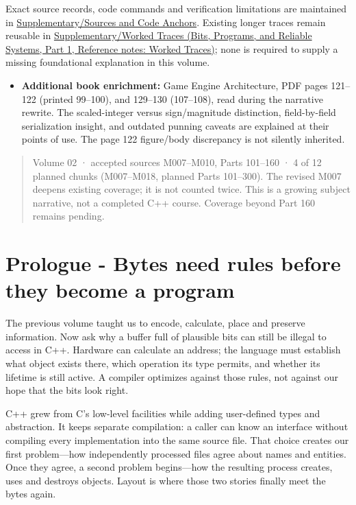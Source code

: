 Exact source records, code commands and verification limitations are maintained in \hyperref[appendix-a103e7846d21]{Supplementary/Sources and Code Anchors}. Existing longer traces remain reusable in \href{../01-Bits-Programs-and-Reliable-Systems-P01/main.pdf\#nameddest=appendix-92ff77d4dfdc}{Supplementary/Worked Traces (Bits, Programs, and Reliable Systems, Part 1, Reference notes: Worked Traces)}; none is required to supply a missing foundational explanation in this volume.

\begin{itemize}
\tightlist
\item
  \textbf{Additional book enrichment:} Game Engine Architecture, PDF pages 121--122 (printed 99--100), and 129--130 (107--108), read during the narrative rewrite. The scaled-integer versus sign/magnitude distinction, field-by-field serialization insight, and outdated punning caveats are explained at their points of use. The page 122 figure/body discrepancy is not silently inherited.
\end{itemize}

\begin{quote}
Volume 02 · accepted sources M007--M010, Parts 101--160 · 4 of 12 planned chunks (M007--M018, planned Parts 101--300). The revised M007 deepens existing coverage; it is not counted twice. This is a growing subject narrative, not a completed C++ course. Coverage beyond Part 160 remains pending.
\end{quote}

\section{Prologue - Bytes need rules before they become a program}\label{01-foundations-i-ch002-prologue---bytes-need-rules-before-they-become-a-program}

\hypertarget{01-foundations-i-ch002-prologue---bytes-need-rules-before-they-become-a-program}{}

The previous volume taught us to encode, calculate, place and preserve information. Now ask why a buffer full of plausible bits can still be illegal to access in C++. Hardware can calculate an address; the language must establish what object exists there, which operation its type permits, and whether its lifetime is still active. A compiler optimizes against those rules, not against our hope that the bits look right.

C++ grew from C's low-level facilities while adding user-defined types and abstraction. It keeps separate compilation: a caller can know an interface without compiling every implementation into the same source file. That choice creates our first problem---how independently processed files agree about names and entities. Once they agree, a second problem begins---how the resulting process creates, uses and destroys objects. Layout is where those two stories finally meet the bytes again.

